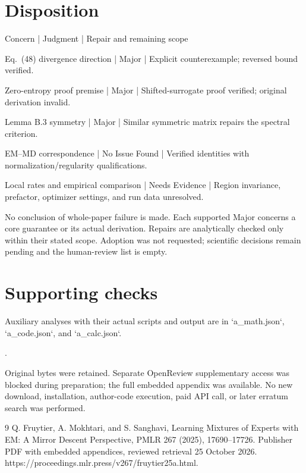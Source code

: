 \documentclass[10pt]{article}
\begin{document}
\section*{Disposition}
Concern | Judgment | Repair and remaining scope\par
Eq. (48) divergence direction | Major | Explicit counterexample; reversed bound verified.\par
Zero-entropy proof premise | Major | Shifted-surrogate proof verified; original derivation invalid.\par
Lemma B.3 symmetry | Major | Similar symmetric matrix repairs the spectral criterion.\par
EM–MD correspondence | No Issue Found | Verified identities with normalization/regularity qualifications.\par
Local rates and empirical comparison | Needs Evidence | Region invariance, prefactor, optimizer settings, and run data unresolved.\par
No conclusion of whole-paper failure is made. Each supported Major concerns a core guarantee or its actual derivation. Repairs are analytically checked only within their stated scope. Adoption was not requested; scientific decisions remain pending and the human-review list is empty.\par
\section*{Supporting checks}
Auxiliary analyses with their actual scripts and output are in `a\_math.json`, `a\_code.json`, and `a\_calc.json`.\par
.\par
Original bytes were retained. Separate OpenReview supplementary access was blocked during preparation; the full embedded appendix was available. No new download, installation, author-code execution, paid API call, or later erratum search was performed.\par
9 Q. Fruytier, A. Mokhtari, and S. Sanghavi, Learning Mixtures of Experts with EM: A Mirror Descent Perspective, PMLR 267 (2025), 17690–17726. Publisher PDF with embedded appendices, reviewed retrieval 25 October 2026. https://proceedings.mlr.press/v267/fruytier25a.html.\par
\end{document}
